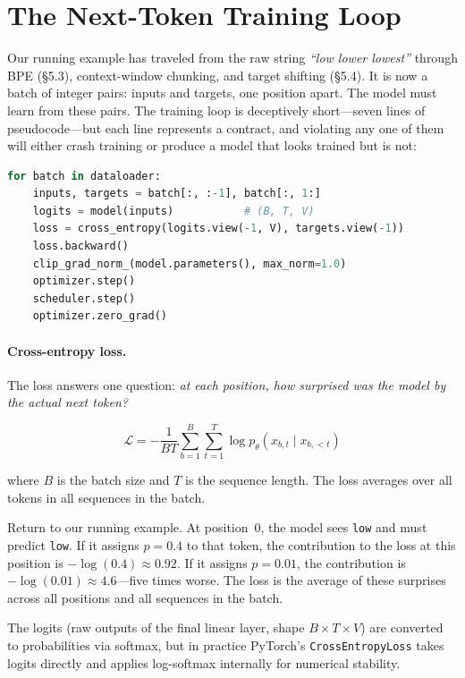 \section{The Next-Token Training Loop}

Our running example has traveled from the raw string \emph{``low lower lowest''} through BPE (\S5.3), context-window chunking, and target shifting (\S5.4). It is now a batch of integer pairs: inputs and targets, one position apart. The model must learn from these pairs. The training loop is deceptively short---seven lines of pseudocode---but each line represents a contract, and violating any one of them will either crash training or produce a model that looks trained but is not:

\begin{lstlisting}[language=Python, caption={Minimal next-token training loop (pseudocode).}]
for batch in dataloader:
    inputs, targets = batch[:, :-1], batch[:, 1:]
    logits = model(inputs)           # (B, T, V)
    loss = cross_entropy(logits.view(-1, V), targets.view(-1))
    loss.backward()
    clip_grad_norm_(model.parameters(), max_norm=1.0)
    optimizer.step()
    scheduler.step()
    optimizer.zero_grad()
\end{lstlisting}

\paragraph{Cross-entropy loss.} The loss answers one question: \emph{at each position, how surprised was the model by the actual next token?}

\[
  \mathcal{L} = -\frac{1}{BT}\sum_{b=1}^{B}\sum_{t=1}^{T} \log p_\theta(x_{b,t} \mid x_{b,<t})
\]

\noindent where $B$ is the batch size and $T$ is the sequence length. The loss averages over all tokens in all sequences in the batch.

Return to our running example. At position~0, the model sees \texttt{low} and must predict \texttt{\textvisiblespace low}. If it assigns $p = 0.4$ to that token, the contribution to the loss at this position is $-\log(0.4) \approx 0.92$. If it assigns $p = 0.01$, the contribution is $-\log(0.01) \approx 4.6$---five times worse. The loss is the average of these surprises across all positions and all sequences in the batch.

The logits (raw outputs of the final linear layer, shape $B \times T \times V$) are converted to probabilities via softmax, but in practice PyTorch's \texttt{CrossEntropyLoss} takes logits directly and applies log-softmax internally for numerical stability.


